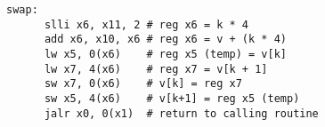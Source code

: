 \documentclass[varwidth, convert]{standalone}
\begin{document}
  \begin{BVerbatim}[gobble=4]
    swap:
      slli x6, x11, 2 # reg x6 = k * 4
      add x6, x10, x6 # reg x6 = v + (k * 4)
      lw x5, 0(x6)    # reg x5 (temp) = v[k]
      lw x7, 4(x6)    # reg x7 = v[k + 1]
      sw x7, 0(x6)    # v[k] = reg x7
      sw x5, 4(x6)    # v[k+1] = reg x5 (temp)
      jalr x0, 0(x1)  # return to calling routine
  \end{BVerbatim}
\end{document}
